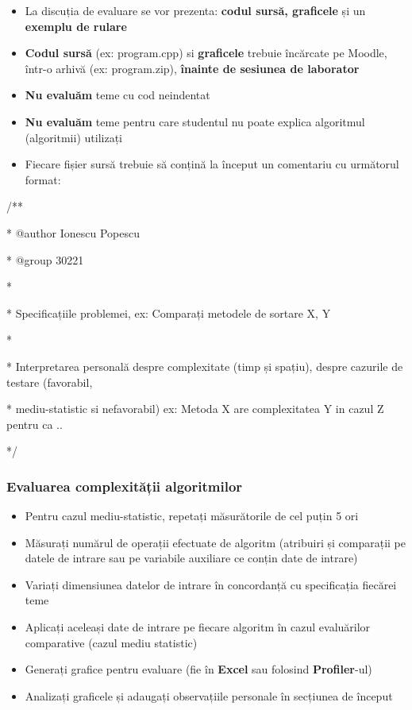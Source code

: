 \documentclass[../en-fa-lab.tex]{subfiles}
\begin{document}
\begin{itemize}
\item
  La discuția de evaluare se vor prezenta: \textbf{codul sursă,
  graficele} și un \textbf{exemplu de rulare}
\item
  \textbf{Codul sursă} (ex: program.cpp) si \textbf{graficele} trebuie
  încărcate pe Moodle, într-o arhivă (ex: program.zip), \textbf{
  înainte de sesiunea de laborator}
\item
  \textbf{Nu evaluăm} teme cu cod neindentat
\item
  \textbf{Nu evaluăm} teme pentru care studentul nu poate explica
  algoritmul (algoritmii) utilizați
\item
  Fiecare fișier sursă trebuie să conțină la început un comentariu cu
  următorul format:
\end{itemize}

/**

* @author Ionescu Popescu

* @group 30221

*

* Specificațiile problemei, ex: Comparați metodele de sortare X, Y

*

* Interpretarea personală despre complexitate (timp și spațiu), despre
cazurile de testare (favorabil,

* mediu-statistic si nefavorabil) ex: Metoda X are complexitatea Y in
cazul Z pentru ca ..

*/

\subsubsection{Evaluarea complexității
algoritmilor}\label{evaluarea-complexitux103ux21bii-algoritmilor}

\begin{itemize}
\item
  Pentru cazul mediu-statistic, repetați măsurătorile de cel puțin 5 ori
\item
  Măsurați numărul de operații efectuate de algoritm (atribuiri și
  comparații pe datele de intrare sau pe variabile auxiliare ce conțin
  date de intrare)
\item
  Variați dimensiunea datelor de intrare în concordanță cu specificația
  fiecărei teme
\item
  Aplicați aceleași date de intrare pe fiecare algoritm în cazul
  evaluărilor comparative (cazul mediu statistic)
\item
  Generați grafice pentru evaluare (fie în \textbf{Excel} sau folosind
  \textbf{Profiler}-ul)
\item
  Analizați graficele și adaugați observațiile personale în secțiunea de
  început
\end{itemize}
\end{document}
